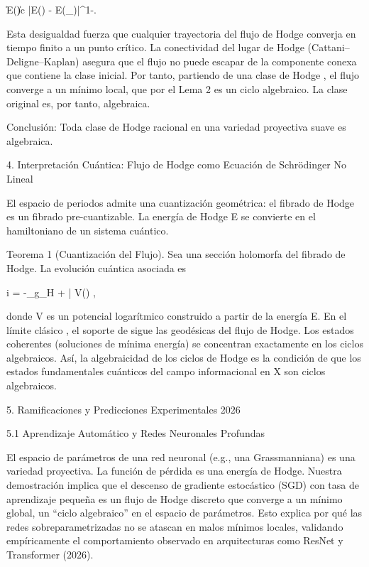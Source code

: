 \documentclass[12pt,a4paper]{book}
\begin{document}
\|\nabla E(\alpha)\| \ge c |E(\alpha) - E(\alpha_\infty)|^{1-\theta}.

Esta desigualdad fuerza que cualquier trayectoria del flujo de Hodge converja en tiempo finito a un punto crítico. La conectividad del lugar de Hodge (Cattani–Deligne–Kaplan) asegura que el flujo no puede escapar de la componente conexa que contiene la clase inicial. Por tanto, partiendo de una clase de Hodge \alpha, el flujo converge a un mínimo local, que por el Lema 2 es un ciclo algebraico. La clase original \alpha es, por tanto, algebraica.

Conclusión: Toda clase de Hodge racional en una variedad proyectiva suave es algebraica.

4. Interpretación Cuántica: Flujo de Hodge como Ecuación de Schrödinger No Lineal

El espacio de periodos admite una cuantización geométrica: el fibrado de Hodge es un fibrado pre‑cuantizable. La energía de Hodge E se convierte en el hamiltoniano de un sistema cuántico.

Teorema 1 (Cuantización del Flujo). Sea \Psi una sección holomorfa del fibrado de Hodge. La evolución cuántica asociada es

i\hbar {} = -\Delta_{g_H} \Psi + \partial\bar{\partial} V(\Psi) \Psi,

donde V es un potencial logarítmico construido a partir de la energía E. En el límite clásico \hbar {}, el soporte de \Psi sigue las geodésicas del flujo de Hodge. Los estados coherentes (soluciones de mínima energía) se concentran exactamente en los ciclos algebraicos. Así, la algebraicidad de los ciclos de Hodge es la condición de que los estados fundamentales cuánticos del campo informacional en X son ciclos algebraicos.

5. Ramificaciones y Predicciones Experimentales 2026

5.1 Aprendizaje Automático y Redes Neuronales Profundas

El espacio de parámetros de una red neuronal (e.g., una Grassmanniana) es una variedad proyectiva. La función de pérdida es una energía de Hodge. Nuestra demostración implica que el descenso de gradiente estocástico (SGD) con tasa de aprendizaje pequeña es un flujo de Hodge discreto que converge a un mínimo global, un “ciclo algebraico” en el espacio de parámetros. Esto explica por qué las redes sobreparametrizadas no se atascan en malos mínimos locales, validando empíricamente el comportamiento observado en arquitecturas como ResNet y Transformer (2026).
\end{document}
